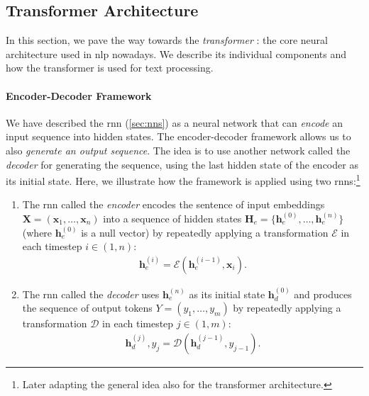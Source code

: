 {\subsection{Transformer Architecture}
\label{sec:transformer}
In this section, we pave the way towards the \emph{transformer} \cite{vaswani2017attention}: the core neural architecture used in \ac{nlp} nowadays. We describe its individual components and how the transformer is used for text processing.

\paragraph{Encoder-Decoder Framework}
We have described the \ac{rnn} (\autoref{sec:nns}) as a neural network that can \emph{encode} an input sequence into hidden states. The encoder-decoder framework \cite{sutskever2014sequence,cho2014learning} allows us to also \emph{generate an output sequence}. The idea is to use another network called the \emph{decoder} for generating the sequence, using the last hidden state of the encoder as its initial state. Here, we illustrate how the framework is applied using two \acp{rnn}:\footnote{Later adapting the general idea also for the transformer architecture.}

\begin{enumerate}
    \item The \ac{rnn} called the \emph{encoder} encodes the sentence of input embeddings $\mathbf{X}= (\mathbf{x}_1, \ldots, \mathbf{x}_n)$ into a sequence of hidden states $\mathbf{H}_e = \{\mathbf{h}_e^{(0)}, \ldots, \mathbf{h}_e^{(n)}\}$ (where $\mathbf{h}_e^{(0)}$ is a null vector) by repeatedly applying a transformation $\mathcal{E}$ in each timestep $i\in(1,n)$:
          \begin{align}
              \mathbf{h}_e^{(i)} = \mathcal{E}(\mathbf{h}_e^{(i-1)}, \mathbf{x}_i).
          \end{align}
    \item The \ac{rnn} called the \emph{decoder} uses $\mathbf{h}_e^{(n)}$ as its initial state $\mathbf{h}_d^{(0)}$ and produces the sequence of output tokens  $Y = (y_1, \ldots, y_m)$ by repeatedly applying a transformation $\mathcal{D}$ in each timestep $j\in(1,m)$:
          \begin{align}
              \mathbf{h}_d^{(j)}, y_j = \mathcal{D}(\mathbf{h}_d^{(j-1)}, y_{j-1}).
          \end{align}
\end{enumerate}

}

